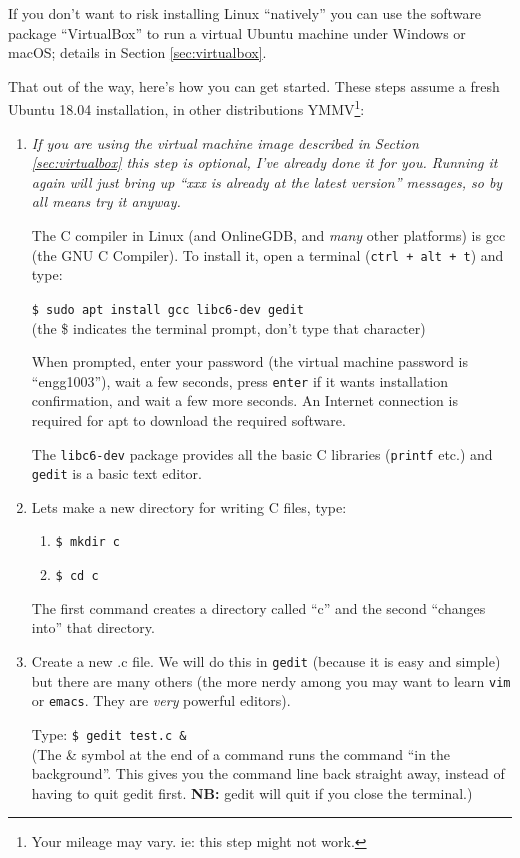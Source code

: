 \documentclass{lab}
\begin{document}
If you don't want to risk installing Linux ``natively'' you can use the software package ``VirtualBox'' to run a virtual Ubuntu machine under Windows or macOS; details in Section \ref{sec:virtualbox}.

That out of the way, here's how you can get started. These steps assume a fresh Ubuntu 18.04 installation, in other distributions YMMV\footnote{Your mileage may vary. ie: this step might not work.}:

\begin{enumerate}
\item \textit{If you are using the virtual machine image described in Section \ref{sec:virtualbox} this step is optional, I've already done it for you. Running it again will just bring up ``xxx is already at the latest version'' messages, so by all means try it anyway.}

The C compiler in Linux (and OnlineGDB, and \textit{many} other platforms) is gcc (the GNU C Compiler). To install it, open a terminal (\texttt{ctrl + alt + t}) and type:

\texttt{\$ sudo apt install gcc libc6-dev gedit}\\ (the \$ indicates the terminal prompt, don't type that character)

When prompted, enter your password (the virtual machine password is ``engg1003''), wait a few seconds, press \texttt{enter} if it wants installation confirmation, and wait a few more seconds. An Internet connection is required for apt to download the required software.

The \texttt{libc6-dev} package provides all the basic C libraries (\texttt{printf} etc.) and \texttt{gedit} is a basic text editor.

\item Lets make a new directory for writing C files, type:
\begin{enumerate}
	\item \texttt{\$ mkdir c}
	\item \texttt{\$ cd c}
\end{enumerate}
The first command creates a directory called ``c'' and the second ``changes into'' that directory.

\item Create a new .c file. We will do this in \texttt{gedit} (because it is easy and simple) but there are many others (the more nerdy among you may want to learn \texttt{vim} or \texttt{emacs}. They are \textit{very} powerful editors).

Type: \texttt{\$ gedit test.c \&} \\ (The \& symbol at the end of a command runs the command ``in the background''. This gives you the command line back straight away, instead of having to quit gedit first. \textbf{NB:} gedit will quit if you close the terminal.)


\end{enumerate}
\end{document}
